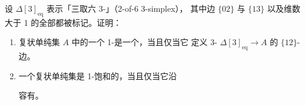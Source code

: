 \begin{exercise}\label{ex:two-of-six-simplex}
设 $\Delta[3]_{\mathrm{eq}}$ 表示「三取六 3-\trSimplex」（2-of-6 3-simplex），
其中边 $\{02\}$ 与 $\{13\}$ 以及维数大于 1 的全部\trSimplex{}都被标记。证明：
\begin{enumerate}[label=(\roman*)]
\item 复状单纯集 $A$ 中的一个 1-\trSimplex{}是一个\trEquivalence，当且仅当它
  定义 3-\trSimplex{} $\Delta[3]_{\mathrm{eq}}\to A$ 的 $\{12\}$-边。
\item 一个复状单纯集是 1-饱和的，当且仅当它沿\trEntireInclusion
\begin{center}
\end{center}
  容有\trExtension。
\end{enumerate}
\end{exercise}












